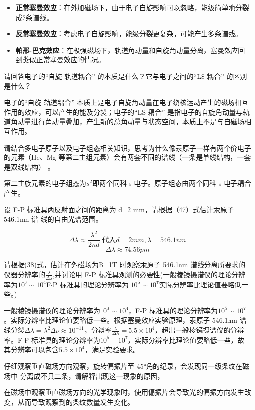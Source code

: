 \documentclass[dvipsnames, svgnames,a4paper,11pt]{article}
\begin{document}
\begin{itemize}
  \item \textbf{正常塞曼效应}：在外加磁场下，由于电子自旋影响可以忽略，能级简单地分裂成3条谱线。
  \item \textbf{反常塞曼效应}：考虑电子自旋影响，能级分裂更复杂，可能产生多条谱线。
  \item \textbf{帕邢-巴克效应}：在极强磁场下，轨道角动量和自旋角动量分离，塞曼效应回到类似正常塞曼效应的情况。
\end{itemize}


\begin{question}
	请回答电子的“自旋-轨道耦合” 的本质是什么？它与电子之间的“LS 耦合” 的区别是什么？
\end{question}

电子的“自旋-轨道耦合” 本质上是电子自旋角动量在电子绕核运动产生的磁场相互作用的效应，可以产生的能及分裂；电子的“LS 耦合” 是指电子的自旋角动量与轨道角动量进行角动量叠加，产生新的总角动量与状态空间，本质上不是与自磁场相互作用。
\begin{question}
	请结合多电子原子以及电子组态相关知识，思考为什么像汞原子一样有两个价电子的元素（He、Mg 等第二主组元素）会有两套不同的谱线（一条是单线结构，一套是双线结构） 。
\end{question}
第二主族元素的电子组态为$s^2$即两个同科 s 电子。原子组态由两个同科 s 电子耦合产生。

\begin{question}
	设 F-P 标准具两反射面之间的距离为 d=2 mm，请根据（47）式估计汞原子 546.1nm 谱
	线的自由光谱范围。
	
\end{question}
$$\Delta\lambda\approx\frac{\lambda^2}{2nd}\text{ 代入}d=2mm,\lambda=546.1nm$$$$\Delta\lambda\approx74.56pm$$

\begin{question}
	请根据(38)式，估计在外磁场为B=1T 时观察汞原子 546.1nm 谱线分离所要求的仪器分辨率的$\frac\lambda{\Delta\lambda}$,并讨论用 F-P 标准具观测的必要性(一般棱镜摄谱仪的理论分辨率为$10^3 \sim 10^4$F-P 标准具的理论分辨率为 $10^5 \sim 10^7$实际分辨率比理论值要略低一些。)
\end{question}
一般棱镜摄谱仪的理论分辨率为\(10^3 \sim 10^4\)，F-P 标准具的理论分辨率为\(10^5 \sim 10^7\)。实际分辨率比理论值要略低一些。根据塞曼效应实验原理，汞原子 546.1nm 谱线分裂\(\Delta\lambda=\lambda^2\Delta\nu\approx10^{-11}\)，分辨率\(\frac{\lambda}{\Delta\lambda}=5.5\times10^4\)，超出一般棱镜摄谱仪的分辨率。F-P 标准具的理论分辨率为\(10^5-10^7\)，实际分辨率比理论值要略低一些，故其分辨率可以包含\(5.5\times10^4\)，满足实验要求。
\begin{question}
	仔细观察垂直磁场方向观察，旋转偏振片至 45°角的纪录，会发现同一级条纹在磁场中
	分离成不只二条，请解释出现这一现象的原因，
\end{question}
在磁场中观察垂直磁场方向的光学现象时，使用偏振片会导致光的偏振方向发生改变，从而导致观察到的条纹数量发生变化。
\end{document}
